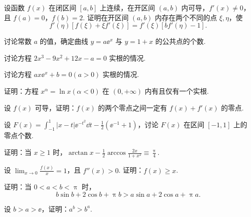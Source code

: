 	\begin{ti}
		设函数 $f(x)$ 在闭区间 $[a,b]$ 上连续，在开区间 $(a,b)$ 内可导，$f'(x) \ne 0$，且 $f(a) = 0$，$f(b) = 2$. 证明在开区间 $(a,b)$ 内存在两个不同的点 $\xi,\eta$，使
		\[
			f'(\eta) \left[ f(\xi) + \xi f'(\xi) \right] = f'(\xi) \left[ b f'(\eta) - 1 \right].
		\]
	\end{ti}

	\begin{ti}
		讨论常数 $a$ 的值，确定曲线 $y = a \ee^{x}$ 与 $y = 1 + x$ 的公共点的个数.
	\end{ti}

	\begin{ti}
		讨论方程 $2x^{3} - 9x^{2} + 12x - a = 0$ 实根的情况.
	\end{ti}

	\begin{ti}
		讨论方程 $a x \ee^{x} + b = 0 (a > 0)$ 实根的情况.
	\end{ti}

	\begin{ti}
		证明：方程 $x^{\alpha} = \ln x (\alpha < 0)$ 在 $(0,+\infty)$ 内有且仅有一个实根.
	\end{ti}

	\begin{ti}
		设 $f(x)$ 可导，证明：$f(x)$ 的两个零点之间一定有 $f(x) + f'(x)$ 的零点.
	\end{ti}

	\begin{ti}
		设 $F(x) = \int_{-1}^{1} |x - t| \ee^{-t^{2}} \dd{t} - \frac{1}{2} \left( \ee^{-1} + 1 \right)$，讨论 $F(x)$ 在区间 $[-1,1]$ 上的零点个数.
	\end{ti}

	\begin{ti}
		证明：当 $x \geq 1$ 时，$\arctan x - \frac{1}{2} \arccos \frac{2x}{1 + x^{2}} \equiv \frac{\uppi}{4}$.
	\end{ti}

	\begin{ti}
		设 $\lim_{x \to 0} \frac{f(x)}{x} = 1$，且 $f''(x) > 0$. 证明：$f(x) \geq x$.
	\end{ti}

	\begin{ti}
		证明：当 $0 < a < b < \uppi$ 时，
		\[
			b \sin b + 2 \cos b + \uppi b > a \sin a + 2 \cos a + \uppi a.
		\]
	\end{ti}

	\begin{ti}
		设 $b > a > \ee$，证明：$a^{b} > b^{a}$.
	\end{ti}

